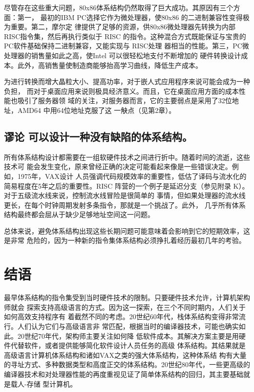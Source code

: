 尽管存在这些重大问题，80x86体系结构仍然取得了巨大成功。其原因有三个方面：第一，
最初的IBM PC选择它作为微处理器，使80x86 的二进制兼容性变得极为重要。第二，摩尔定
律提供了足够的资源，供80x86微处理器先转换为内部 RISC指令集，然后再执行类似于 RISC
的指令。这种混合方式既能保证与宝贵的PC软件基础保持二进制兼容，又能实现与 RISC处理
器相当的性能。第三，PC微处理器的销售量如此之高，使Intel 可以很轻松地支付不断增加的
硬件转换设计成本。此外，高销售量使制造商能够抬高学习曲线，降低生产成本。

为进行转换而增大晶粒大小、提高功率，对于嵌人式应用程序来说可能会成为一种负担，
而对于桌面应用来说则极具经济意义。而且，它在桌面应用方面的成本性能也吸引了服务器领
域的关注，对服务器而言，它的主要弱点是采用了32位地址，AMD64 中用64位地址克服了这
一觖点（见第2章）。

\subsection{谬论 可以设计一种没有缺陷的体系结构。}
所有体系结构设计都需要在一组软硬件技术之间进行折中。随着时间的流逝，这些技术可
能会发生变化，原来曾经正确的决定可能看起来像是一些错误决定。例如，1975年，VAX设计
人员强调代码规模效率的重要性，低估了译码与流水化的简易程度在5年之后的重要性。RISC
阵营的一个例子是延迟分支（参见附录 K）。对于五级流水线来说，控制流水线冒险是很简单的
事情，但如果处理器的流水线更长，在每个时钟周期发射多条指令，那就是一个挑战了。此外，
几乎所有体系结构最终都会屈从于缺少足够地址空间这一问题。

总体来说，避免体系结构出现这些长期问题可能意味着会影响到它的短期效率，这是非常
危险的，因为一种新的指令集体系结构必须挣扎着经历最初几年的考验。

\section{结语}
最早体系结构的指令集受到当时硬件技术的限制。只要硬件技术允许，计算机架构师就会
探索支持高级语言的方式。因为这一探索，在三个不同时期内，人们关于如何高效支持程序有
着截然不同的考虑。20世纪60年代，栈体系结构变得非常流行。人们认为它们与高级语言非
常匹配，根据当时的编译器技术，可能也确实如此。20世纪70年代，架构师主要关注如何降
低软件成本。其解决方案主要是用硬件代替软件，或者提供能够简化软件设计人员任务的高级
体系结构。其结果就是高级语言计算机体系结构和诸如VAX之类的强大体系结构，这种体系结
构有大量的寻址方式、多种数据类型和高度正交的体系结构。20世纪80年代，一些更高级的
编译器技术和对处理器性能的再度重视见证了简单体系结构的回归，其主要基础就是载人-存储
型计算机。

